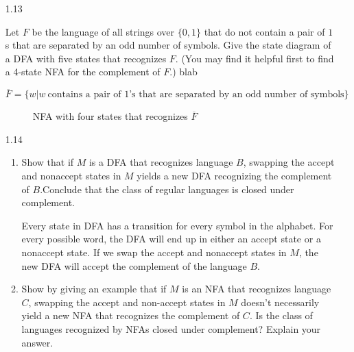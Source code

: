 \begin{enumerate}

    \item [1.13]

          Let $F$ be the language of all strings over $\{0,1\}$ that do not contain a pair of $1$s that are separated by an odd number of symbols. Give the state diagram of a DFA with five states that recognizes $F$. (You may find it helpful first to find a 4-state NFA for the complement of $F$.) blab

          $\overline{F} = \{w|w~ \text{contains a pair of }1\text{'s that are separated by an odd number of symbols}\}$

          \begin{figure}[H]
              \centering
              \caption{NFA with four states that recognizes $\overline{F}$}
          \end{figure}
    \item [1.14]
          \begin{enumerate}
              \item Show that if $M$ is a DFA that recognizes language $B$, swapping the accept and nonaccept states in $M$ yields a new DFA recognizing the complement of $B$.Conclude that the class of regular languages is closed under complement.

                    Every state in DFA has a transition for every symbol in the alphabet. For every possible word, the DFA will end up in either an accept state or a nonaccept state. If we swap the accept and nonaccept states in $M$, the new DFA will accept the complement of the language $B$.

              \item Show by giving an example that if $M$ is an NFA that recognizes language $C$, swapping the accept and non-accept states in $M$ doesn’t necessarily yield a new NFA that recognizes the complement of $C$. Is the class of languages recognized by NFAs closed under complement? Explain your answer.


\end{enumerate}
\end{enumerate}

